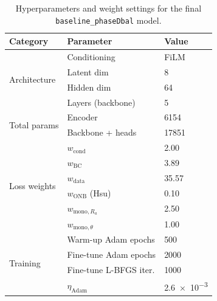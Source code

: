 \begin{table}[!htbp]
\caption{Hyperparameters and weight settings for the final
  \texttt{baseline\_phaseDbal} model.}
\label{tab:hyperparameters}
\small
\centering
\begin{tabular}{lll}
\hline
Category & Parameter & Value \\
\hline
\multirow{4}{*}{Architecture}
  & Conditioning      & FiLM \\
  & Latent dim        & 8 \\
  & Hidden dim        & 64 \\
  & Layers (backbone) & 5 \\
\hline
\multirow{2}{*}{Total params}
  & Encoder           & \num{6154} \\
  & Backbone + heads  & \num{17851} \\
\hline
\multirow{6}{*}{Loss weights}
  & $w_{\mathrm{cond}}$        & \num{2.00} \\
  & $w_{\mathrm{BC}}$          & \num{3.89} \\
  & $w_{\mathrm{data}}$        & \num{35.57} \\
  & $w_{\mathrm{ONB}}$ (Hsu)   & \num{0.10} \\
  & $w_{\mathrm{mono},R_a}$    & \num{2.50} \\
  & $w_{\mathrm{mono},\theta}$ & \num{1.00} \\
\hline
\multirow{4}{*}{Training}
  & Warm-up Adam epochs    & \num{500} \\
  & Fine-tune Adam epochs  & \num{2000} \\
  & Fine-tune L-BFGS iter. & \num{1000} \\
  & $\eta_{\mathrm{Adam}}$ & \num{2.6e-3} \\
\hline
\end{tabular}
\end{table}
